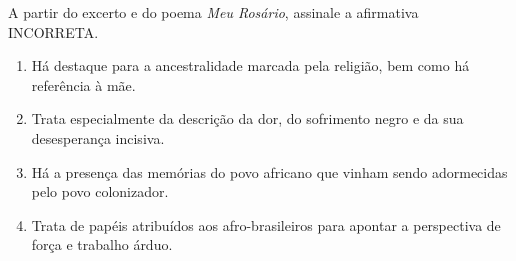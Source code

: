 \par

A partir do excerto e do poema \textit{Meu Rosário}, assinale a afirmativa INCORRETA.\begin{enumerate}
\item Há destaque para a ancestralidade marcada pela religião, bem como há referência à mãe.
\item Trata especialmente da descrição da dor, do sofrimento negro e da sua desesperança incisiva.
\item Há a presença das memórias do povo africano que vinham sendo adormecidas pelo povo colonizador.
\item Trata de papéis atribuídos aos afro-brasileiros para apontar a perspectiva de força e trabalho árduo.\end{enumerate}
